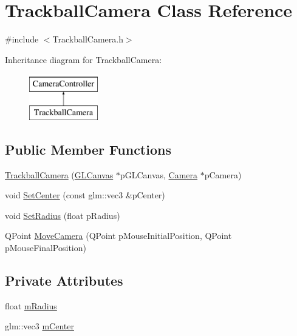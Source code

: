 \hypertarget{class_trackball_camera}{\section{Trackball\+Camera Class Reference}
\label{class_trackball_camera}
}


{\ttfamily \#include $<$Trackball\+Camera.\+h$>$}

Inheritance diagram for Trackball\+Camera\+:\begin{figure}[H]
\begin{center}
\leavevmode
\includegraphics[height=2.000000cm]{class_trackball_camera}
\end{center}
\end{figure}
\subsection*{Public Member Functions}
\begin{DoxyCompactItemize}
\item 
\hyperlink{class_trackball_camera_a18a1045967ddace673e1abd016f56782}{Trackball\+Camera} (\hyperlink{class_g_l_canvas}{G\+L\+Canvas} $\ast$p\+G\+L\+Canvas, \hyperlink{class_camera}{Camera} $\ast$p\+Camera)
\item 
void \hyperlink{class_trackball_camera_a9f854469a00f80c60258ef290e0ecf6e}{Set\+Center} (const glm\+::vec3 \&p\+Center)
\item 
void \hyperlink{class_trackball_camera_ac8c56b74ee877a90e96e2ae025a6a3a3}{Set\+Radius} (float p\+Radius)
\item 
Q\+Point \hyperlink{class_trackball_camera_a109910e12db50a4e4fe9d26b093480da}{Move\+Camera} (Q\+Point p\+Mouse\+Initial\+Position, Q\+Point p\+Mouse\+Final\+Position)
\end{DoxyCompactItemize}
\subsection*{Private Attributes}
\begin{DoxyCompactItemize}
\item 
float \hyperlink{class_trackball_camera_a73114de86526d04c3e04864e46e224e2}{m\+Radius}
\item 
glm\+::vec3 \hyperlink{class_trackball_camera_aef9b92c4a1d08a88444e440e45638a57}{m\+Center}
\end{DoxyCompactItemize}
